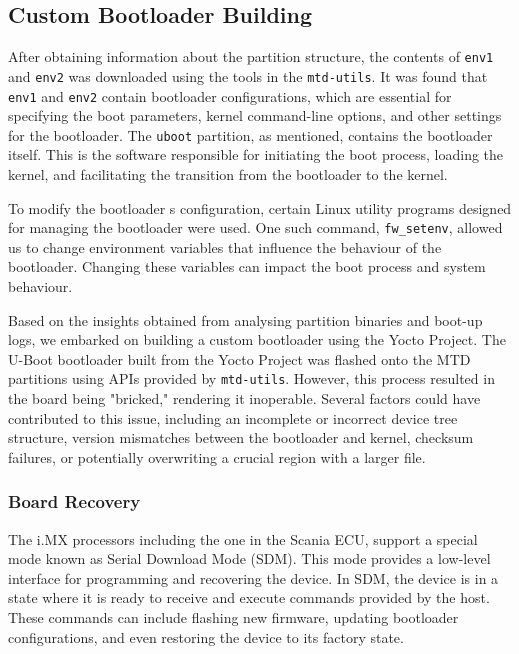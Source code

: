 \subsection{Custom Bootloader Building}

After obtaining information about the partition structure, the contents of \texttt{env1} and \texttt{env2} was downloaded using the tools in the \texttt{mtd-utils}. It was found that \texttt{env1} and \texttt{env2} contain bootloader configurations, which are essential for specifying the boot parameters, kernel command-line options, and other settings for the bootloader. The \texttt{uboot} partition, as mentioned, contains the bootloader itself. This is the software responsible for initiating the boot process, loading the kernel, and facilitating the transition from the bootloader to the kernel.

To modify the bootloader \textquotesingle s configuration, certain Linux utility programs designed for managing the bootloader were used. One such command, \texttt{fw\_setenv}, allowed us to change environment variables that influence the behaviour of the bootloader. Changing these variables can impact the boot process and system behaviour.

Based on the insights obtained from analysing partition binaries and boot-up logs, we embarked on building a custom bootloader using the Yocto Project. The U-Boot bootloader built from the Yocto Project was flashed onto the MTD partitions using APIs provided by \texttt{mtd-utils}. However, this process resulted in the board being "bricked," rendering it inoperable. Several factors could have contributed to this issue, including an incomplete or incorrect device tree structure, version mismatches between the bootloader and kernel, checksum failures, or potentially overwriting a crucial region with a larger file.

\subsubsection{Board Recovery}

The i.MX processors including the one in the Scania ECU, support a special mode known as Serial Download Mode (SDM). This mode provides a low-level interface for programming and recovering the device. In SDM, the device is in a state where it is ready to receive and execute commands provided by the host. These commands can include flashing new firmware, updating bootloader configurations, and even restoring the device to its factory state.


